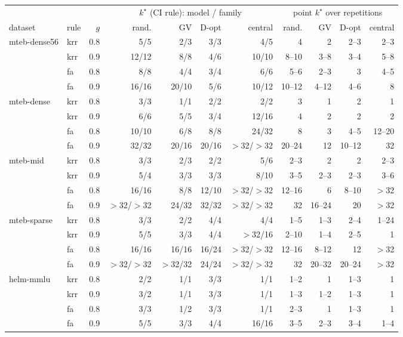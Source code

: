 \begin{tabular}{llrrrrrrrrr}
\toprule
 & & & \multicolumn{4}{c}{$k^\star$ (CI rule): model / family} & \multicolumn{4}{c}{point $k^\star$ over repetitions} \\
\cmidrule(lr){4-7}\cmidrule(lr){8-11}
dataset & rule & $g$ & rand. & GV & D-opt & central & rand. & GV & D-opt & central \\
\midrule
mteb-dense56 & krr & 0.8 & 5/5 & 2/3 & 3/3 & 4/5 & 4 & 2 & 2--3 & 2--3 \\
 & krr & 0.9 & 12/12 & 8/8 & 4/6 & 10/10 & 8--10 & 3--8 & 3--4 & 5--8 \\
 & fa & 0.8 & 8/8 & 4/4 & 3/4 & 6/6 & 5--6 & 2--3 & 3 & 4--5 \\
 & fa & 0.9 & 16/16 & 20/10 & 5/6 & 10/12 & 10--12 & 4--12 & 4--6 & 8 \\
\midrule
mteb-dense & krr & 0.8 & 3/3 & 1/1 & 2/2 & 2/2 & 3 & 1 & 2 & 1 \\
 & krr & 0.9 & 6/6 & 5/5 & 3/4 & 12/16 & 4 & 2 & 2 & 2 \\
 & fa & 0.8 & 10/10 & 6/8 & 8/8 & 24/32 & 8 & 3 & 4--5 & 12--20 \\
 & fa & 0.9 & 32/32 & 20/16 & 20/16 & $>$32/$>$32 & 20--24 & 12 & 10--12 & 32 \\
\midrule
mteb-mid & krr & 0.8 & 3/3 & 2/3 & 2/2 & 5/6 & 2--3 & 2 & 2 & 2--3 \\
 & krr & 0.9 & 5/4 & 3/3 & 3/3 & 8/10 & 3--5 & 2--3 & 2--3 & 3--6 \\
 & fa & 0.8 & 16/16 & 8/8 & 12/10 & $>$32/$>$32 & 12--16 & 6 & 8--10 & $>$32 \\
 & fa & 0.9 & $>$32/$>$32 & 24/32 & 32/32 & $>$32/$>$32 & 32 & 16--24 & 20 & $>$32 \\
\midrule
mteb-sparse & krr & 0.8 & 3/3 & 2/2 & 4/4 & 4/4 & 1--5 & 1--3 & 2--4 & 1--24 \\
 & krr & 0.9 & 5/5 & 3/3 & 4/4 & $>$32/16 & 2--10 & 1--4 & 2--5 & 1 \\
 & fa & 0.8 & 16/16 & 16/16 & 16/24 & $>$32/$>$32 & 12--16 & 8--12 & 12 & $>$32 \\
 & fa & 0.9 & $>$32/$>$32 & $>$32/32 & 24/24 & $>$32/$>$32 & 32 & 20--32 & 20--24 & $>$32 \\
\midrule
helm-mmlu & krr & 0.8 & 2/2 & 1/1 & 3/3 & 1/1 & 1--2 & 1 & 1--3 & 1 \\
 & krr & 0.9 & 3/2 & 1/1 & 3/3 & 1/1 & 1--3 & 1--2 & 1--3 & 1 \\
 & fa & 0.8 & 3/3 & 1/2 & 3/3 & 1/1 & 2--3 & 1 & 1--3 & 1 \\
 & fa & 0.9 & 5/5 & 3/3 & 4/4 & 16/16 & 3--5 & 2--3 & 3--4 & 1--4 \\
\bottomrule
\end{tabular}
